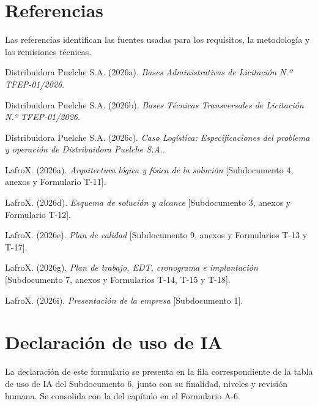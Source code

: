 \documentclass[carta,firma,final]{lafrox}
\begin{document}
\clearpage
{}
\section*{Referencias}

Las referencias identifican las fuentes usadas para los requisitos, la metodología y las remisiones técnicas.

\begin{list}{}{\setlength{\leftmargin}{1.27cm}\setlength{\itemindent}{-1.27cm}\setlength{\itemsep}{3pt}\setlength{\parsep}{0pt}}

  \item Distribuidora Puelche S.A. (2026a). \textit{Bases Administrativas de Licitación N.º TFEP-01/2026}.
  \item Distribuidora Puelche S.A. (2026b). \textit{Bases Técnicas Transversales de Licitación N.º TFEP-01/2026}.
  \item Distribuidora Puelche S.A. (2026c). \textit{Caso Logística: Especificaciones del problema y operación de Distribuidora Puelche S.A.}.
  \item LafroX. (2026a). \textit{Arquitectura lógica y física de la solución} [Subdocumento 4, anexos y Formulario T-11].
  \item LafroX. (2026d). \textit{Esquema de solución y alcance} [Subdocumento 3, anexos y Formulario T-12].
  \item LafroX. (2026e). \textit{Plan de calidad} [Subdocumento 9, anexos y Formularios T-13 y T-17].
  \item LafroX. (2026g). \textit{Plan de trabajo, EDT, cronograma e implantación} [Subdocumento 7, anexos y Formularios T-14, T-15 y T-18].
  \item LafroX. (2026i). \textit{Presentación de la empresa} [Subdocumento 1].
\end{list}

\section*{Declaración de uso de IA}

La declaración de este formulario se presenta en la fila correspondiente de la tabla de uso de IA del Subdocumento 6, junto con su finalidad, niveles y revisión humana. Se consolida con la del capítulo en el Formulario A-6.
\end{document}
